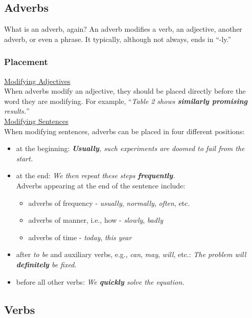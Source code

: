 \subsection{Adverbs}
What is an adverb, again? An adverb modifies a verb, an adjective, another adverb, or even a phrase. It typically, although not always, ends in ``-ly.''

\subsubsection{Placement}
\underline{Modifying Adjectives}\\

\noindent When adverbs modify an adjective, they should be placed directly before the word they are modifying. For example, ``\textit{Table 2 shows \textbf{similarly promising} results.}''\\

\noindent \underline{Modifying Sentences}\\

\noindent When modifying sentences, adverbs can be placed in four different positions:
\begin{itemize}
	\item at the beginning: \textit{\textbf{Usually}, such experiments are doomed to fail from the start.}
	\item at the end: \textit{We then repeat these steps \textbf{frequently}.}\\
	Adverbs appearing at the end of the sentence include:
	
	\begin{itemize}
		\item adverbs of frequency - \textit{usually}, \textit{normally}, \textit{often}, etc.
		\item adverbs of manner, i.e., how - \textit{slowly}, \textit{badly}
		\item adverbs of time - \textit{today}, \textit{this year}
	\end{itemize}
	\item after \textit{to be} and auxiliary verbs, e.g., \textit{can}, \textit{may}, \textit{will}, etc.: \textit{The problem will \textbf{definitely} be fixed.}
	\item before all other verbs: \textit{We \textbf{quickly} solve the equation.}
\end{itemize}

\subsection{Verbs}
